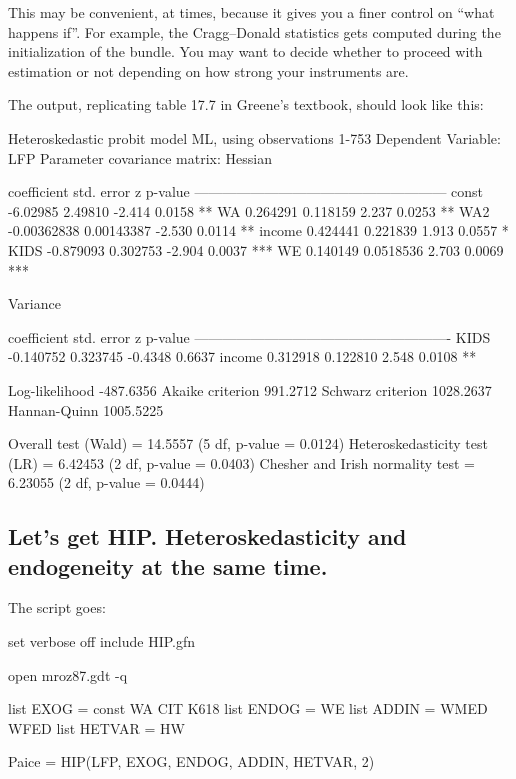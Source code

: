 \documentclass[a4paper,10pt]{article}
\newcounter{script}[section]
\begin{document}
This may be convenient, at times, because it gives you a finer control
on ``what happens if''. For example, the Cragg--Donald statistics gets
computed during the initialization of the bundle. You may want to
decide whether to proceed with estimation or not depending on how
strong your instruments are.

The output, replicating table 17.7 in Greene's textbook, should look
like this:

\begin{code}
Heteroskedastic probit model 
ML, using observations 1-753
Dependent Variable: LFP 
Parameter covariance matrix: Hessian

             coefficient   std. error     z      p-value
  ------------------------------------------------------
  const      -6.02985      2.49810      -2.414   0.0158  **
  WA          0.264291     0.118159      2.237   0.0253  **
  WA2        -0.00362838   0.00143387   -2.530   0.0114  **
  income      0.424441     0.221839      1.913   0.0557  *
  KIDS       -0.879093     0.302753     -2.904   0.0037  ***
  WE          0.140149     0.0518536     2.703   0.0069  ***

Variance 

             coefficient   std. error      z      p-value
  -------------------------------------------------------
  KIDS        -0.140752     0.323745    -0.4348   0.6637 
  income       0.312918     0.122810     2.548    0.0108  **

Log-likelihood        -487.6356  Akaike criterion     991.2712
Schwarz criterion     1028.2637  Hannan-Quinn        1005.5225

Overall test (Wald) = 14.5557 (5 df, p-value = 0.0124)
Heteroskedasticity test (LR) = 6.42453 (2 df, p-value = 0.0403)
Chesher and Irish normality test = 6.23055 (2 df, p-value = 0.0444)
\end{code}

\subsection{Let's get HIP. Heteroskedasticity and endogeneity at the
  same time.}

The script goes:
\begin{code}
set verbose off 
include HIP.gfn

open mroz87.gdt -q

list EXOG =  const WA CIT K618 
list ENDOG = WE
list ADDIN =  WMED WFED 
list HETVAR = HW 

Paice = HIP(LFP, EXOG, ENDOG, ADDIN, HETVAR, 2)
\end{code}
\end{document}
